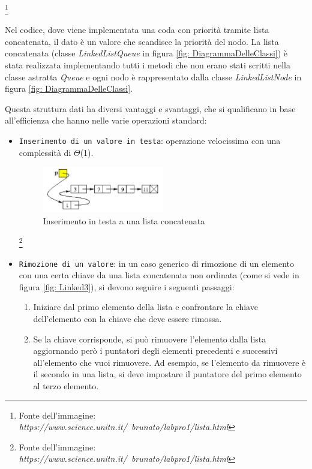 \documentclass{article}
\begin{document}
\footnote{Fonte dell'immagine: \textit{https://www.science.unitn.it/~brunato/labpro1/lista.html}}

Nel codice, dove viene implementata una coda con priorità tramite lista concatenata, il dato è un valore che scandisce la priorità del nodo. La lista concatenata (classe \textit{LinkedListQueue} in figura \ref{fig: DiagrammaDelleClassi}) è stata realizzata implementando tutti i metodi che non erano stati scritti nella classe astratta \textit{Queue} e ogni nodo è rappresentato dalla classe \textit{LinkedListNode} in figura \ref{fig: DiagrammaDelleClassi}.

Questa struttura dati ha diversi vantaggi e svantaggi, che si qualificano in base all'efficienza che hanno nelle varie operazioni standard:

\begin{itemize}
    \item \verb|Inserimento di un valore in testa|: operazione velocissima con una complessità di $\Theta$(1).

    \begin{figure}[H]
    \includegraphics[width=0.5\textwidth]{Images/Linked2.png}
    \centering
    \caption{Inserimento in testa a una lista concatenata}
    \label{fig: Linked2}
    \end{figure}
    
    \footnote{Fonte dell'immagine: \textit{https://www.science.unitn.it/~brunato/labpro1/lista.html}}

    \item \verb|Rimozione di un valore|: in un caso generico di rimozione di un elemento con una certa chiave da una lista concatenata non ordinata (come si vede in figura \ref{fig: Linked3}), si devono seguire i seguenti passaggi:

    \begin{enumerate}
    
    \item Iniziare dal primo elemento della lista e confrontare la chiave dell'elemento con la chiave che deve essere rimossa.

    \item Se la chiave corrisponde, si può rimuovere l'elemento dalla lista aggiornando però i puntatori degli elementi precedenti e successivi all'elemento che vuoi rimuovere. Ad esempio, se l'elemento da rimuovere è il secondo in una lista, si deve impostare il puntatore del primo elemento al terzo elemento.
    

\end{enumerate}
\end{itemize}
\end{document}
